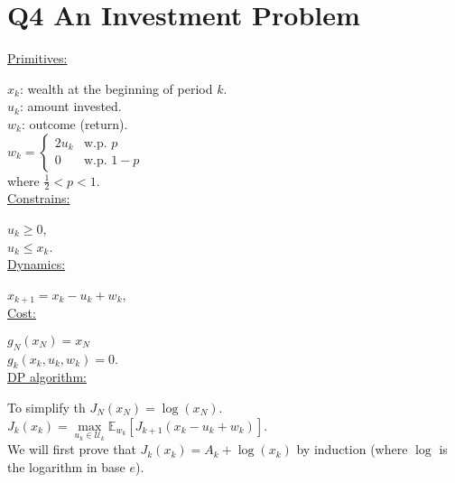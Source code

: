 \documentclass[11pt, english]{article}
\begin{document}
\section*{Q4 An Investment Problem}

\underline{Primitives:\\} 

$x_k$: wealth at the beginning of period $k$.\\
$u_k$: amount invested.\\
$w_k$: outcome (return).\\
$w_k=\left\{\begin{array}{ll}
2u_k & \text{w.p. }p\\
0 & \text{w.p. }1-p
\end{array}\right.$\\
where $\frac{1}{2}<p<1$.\\

\underline{Constrains:\\}

$u_k\geq 0$, \\
$u_k\leq x_k$.\\

\underline{Dynamics:\\}

$x_{k+1}=x_k-u_k+w_k$, \\

\underline{Cost:\\}

$g_N(x_N)=x_N$\\
$g_k(x_k,u_k,w_k)=0$. \\

\underline{DP algorithm:\\}

To simplify th
$J_N(x_N)=\log(x_N)$. \\
$J_k(x_k)=\underset{u_k\in \mathcal{U}_k}{\max}\mathbb{E}_{w_k}\left[J_{k+1}(x_k-u_k+w_k)\right]$.\\
We will first prove that $J_k(x_k)=A_k+\log(x_k)$ by induction (where $\log$ is the logarithm in base $e$).
\end{document}
